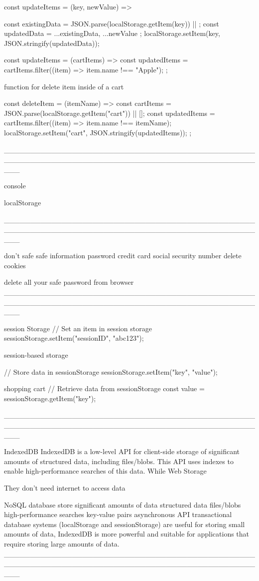 const updateItems = (key, newValue) => {
  const existingData = JSON.parse(localStorage.getItem(key)) || {};
  const updatedData = { ...existingData, ...newValue };
  localStorage.setItem(key, JSON.stringify(updatedData));


  const updateItems = (cartItems) => {
    const updatedItems = cartItems.filter((item) => item.name !== "Apple");
  };


  function for delete item inside of a cart 


    const deleteItem = (itemName) => {
        const cartItems = JSON.parse(localStorage.getItem("cart")) || [];
        const updatedItems = cartItems.filter((item) => item.name !== itemName);
        localStorage.setItem("cart", JSON.stringify(updatedItems));
    };

___________________________________________________________________________________________________


  console 

  localStorage 

  ___________________________________________________________________________________________________

don't safe safe information
password
credit card
social security number 
delete cookies 

delete all your safe password from browser
___________________________________________________________________________________________________

session Storage
// Set an item in session storage
sessionStorage.setItem("sessionID", "abc123");  

session-based storage

// Store data in sessionStorage
sessionStorage.setItem("key", "value");



shopping cart
// Retrieve data from sessionStorage
const value = sessionStorage.getItem("key");

___________________________________________________________________________________________________


IndexedDB
IndexedDB is a low-level API for client-side storage of significant amounts of structured data, including files/blobs. 
This API uses indexes to enable high-performance searches of this data. While Web Storage


They don't need internet to access data

NoSQL database
store significant amounts of data
structured data
files/blobs
high-performance searches
key-value pairs
asynchronous API
transactional database systems (localStorage and sessionStorage) are useful for storing small amounts of data, IndexedDB is more powerful and suitable for applications that require storing large amounts of data.
___________________________________________________________________________________________________

}
